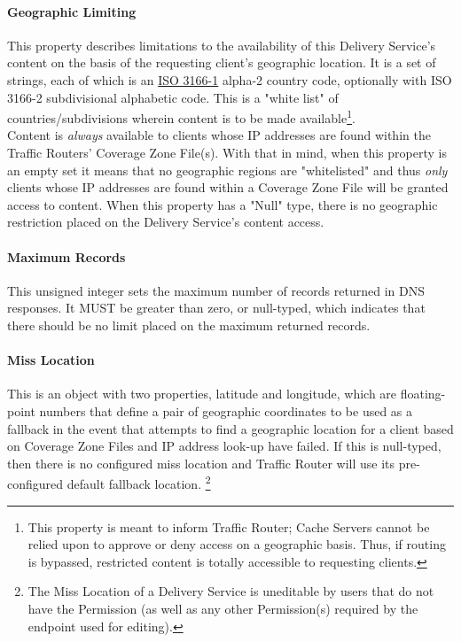 \paragraph{Geographic Limiting}
This property describes limitations to the availability of this Delivery
Service's content on the basis of the requesting client's geographic location.
It is a set of strings, each of which is an
\href{https://www.iso.org/obp/ui/#search/code/}{ISO 3166-1} alpha-2 country
code, optionally with ISO 3166-2 subdivisional alphabetic code. This is a "white
list" of countries/subdivisions wherein content is to be made
available\footnote{This property is meant to inform Traffic Router; Cache
Servers cannot be relied upon to approve or deny access on a geographic basis.
Thus, if routing is bypassed, restricted content is totally accessible to
requesting clients.}.\\
Content is \emph{always} available to clients whose IP addresses are found
within the Traffic Routers' Coverage Zone File(s). With that in mind, when this
property is an empty set it means that no geographic regions are "whitelisted"
and thus \emph{only} clients whose IP addresses are found within a Coverage Zone
File will be granted access to content. When this property has a "Null" type,
there is no geographic restriction placed on the Delivery Service's content
access.


\paragraph{Maximum Records}
This unsigned integer sets the maximum number of records returned in DNS
responses. It MUST be greater than zero, or null-typed, which indicates that
there should be no limit placed on the maximum returned records.

\paragraph{Miss Location}
This is an object with two properties, latitude and longitude, which are
floating-point numbers that define a pair of geographic coordinates to be used as
a fallback in the event that attempts to find a geographic location for a client
based on Coverage Zone Files and IP address look-up have failed. If this is
null-typed, then there is no configured miss location and Traffic Router will
use its pre-configured default fallback location. \footnote{The Miss Location of
a Delivery Service is uneditable by users that do not have the
 Permission (as well as any other
Permission(s) required by the endpoint used for editing).}

